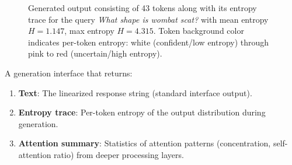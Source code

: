 \begin{figure}[h]
\noindent%
%
%
%
%
%

\vspace{4pt}
\noindent\small%

%
\caption{Generated output consisting of 43 tokens along with its entropy trace for the query \textit{What shape is wombat scat?} with mean entropy $H=1.147$, max entropy $H=4.315$. Token background color indicates per-token entropy: white (confident/low entropy) through pink to red (uncertain/high entropy).}
\label{fig:entropy_trace}
\end{figure}

\begin{definition}
A generation interface that returns:
\begin{enumerate}
\item \textbf{Text}: The linearized response string (standard interface output).
\item \textbf{Entropy trace}: Per-token entropy of the output distribution during
  generation.
\item \textbf{Attention summary}: Statistics of attention patterns (concentration,
  self-attention ratio) from deeper processing layers.
\end{enumerate}
\end{definition}

